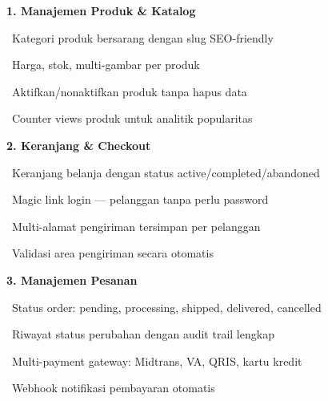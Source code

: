 \documentclass[a4paper]{article}
\begin{document}
\noindent
\begin{minipage}[t]{0.485\textwidth}

    {\fontsize{10.5}{13}\selectfont\bfseries\color{EmeraldPrimary} 1. Manajemen Produk \& Katalog}
    \vspace{3pt}

    {\fontsize{9}{13}\selectfont\color{TextDark}%
    \textbullet\ Kategori produk bersarang dengan slug SEO-friendly\par\vspace{2pt}%
    \textbullet\ Harga, stok, multi-gambar per produk\par\vspace{2pt}%
    \textbullet\ Aktifkan/nonaktifkan produk tanpa hapus data\par\vspace{2pt}%
    \textbullet\ Counter views produk untuk analitik popularitas}%
    \vspace{8pt}

    {\fontsize{10.5}{13}\selectfont\bfseries\color{EmeraldPrimary} 2. Keranjang \& Checkout}
    \vspace{3pt}

    {\fontsize{9}{13}\selectfont\color{TextDark}%
    \textbullet\ Keranjang belanja dengan status active/completed/abandoned\par\vspace{2pt}%
    \textbullet\ Magic link login --- pelanggan tanpa perlu password\par\vspace{2pt}%
    \textbullet\ Multi-alamat pengiriman tersimpan per pelanggan\par\vspace{2pt}%
    \textbullet\ Validasi area pengiriman secara otomatis}%
    \vspace{8pt}

    {\fontsize{10.5}{13}\selectfont\bfseries\color{EmeraldPrimary} 3. Manajemen Pesanan}
    \vspace{3pt}

    {\fontsize{9}{13}\selectfont\color{TextDark}%
    \textbullet\ Status order: pending, processing, shipped, delivered, cancelled\par\vspace{2pt}%
    \textbullet\ Riwayat status perubahan dengan audit trail lengkap\par\vspace{2pt}%
    \textbullet\ Multi-payment gateway: Midtrans, VA, QRIS, kartu kredit\par\vspace{2pt}%
    \textbullet\ Webhook notifikasi pembayaran otomatis}%

\end{minipage}%
\end{document}
